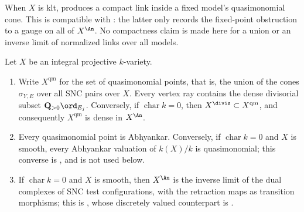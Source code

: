 \begin{remark}
\label{rem:ch32-link-single-model}
When $X$ is klt,  produces a compact
link inside a fixed model's quasimonomial cone.  This is compatible with
: the latter only records the fixed-point
obstruction to a gauge on all of $X^{\An}$.  No compactness claim is made
here for a union or an inverse limit of normalized links over all models.
\end{remark}

\begin{theorem}
\label{thm:ch32-qm-density}
Let $X$ be an integral projective $k$-variety.
\begin{enumerate}
\item\label{itm:ch32-qmd:dense}
Write $X^{\mathrm{qm}}$ for the set of quasimonomial points, that is, the
union of the cones $\sigma_{Y,E}$ over all SNC pairs over $X$.  Every
vertex ray contains the dense divisorial subset
$\mathbf Q_{>0}\ord_{E_j}$.  Conversely, if
$\operatorname{char}k=0$, then $X^{\divis}\subset X^{\mathrm{qm}}$, and
consequently $X^{\mathrm{qm}}$ is dense in $X^{\An}$.
\item\label{itm:ch32-qmd:abhyankar}
Every quasimonomial point is Abhyankar.  Conversely, if
$\operatorname{char}k=0$ and $X$ is smooth, every Abhyankar valuation of
$k(X)/k$ is quasimonomial; this converse is \cite[\S3]{JM12}, and is not
used below.
\item\label{itm:ch32-qmd:limit}
If $\operatorname{char}k=0$ and $X$ is smooth, then $X^{\An}$ is the
inverse limit of the dual complexes of SNC test configurations, with the
retraction maps as transition morphisms; this is
\cite[Appendix~A]{BJ22}, whose discretely valued counterpart is
.
\end{enumerate}
\end{theorem}

